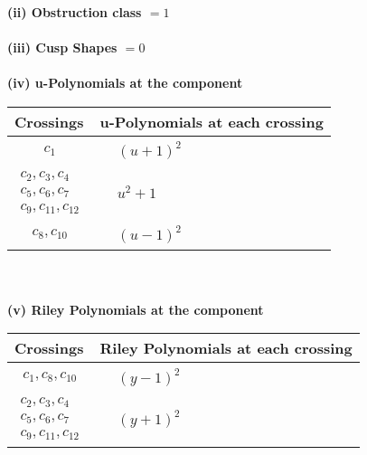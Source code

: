 \documentclass[1p]{elsarticle_modified}
\theoremstyle{definition}
\begin{document}
\flushleft \textbf{(ii) Obstruction class $= 1$}\\~\\
\flushleft \textbf{(iii) Cusp Shapes $= 0$}\\~\\
\newpage\renewcommand{\arraystretch}{1}
\flushleft \textbf{(iv) u-Polynomials at the component}\newline \\
\begin{tabular}{m{50pt}|m{274pt}}
Crossings & \hspace{64pt}u-Polynomials at each crossing \\
\hline $$\begin{aligned}c_{1}\end{aligned}$$&$\begin{aligned}
&(u+1)^2
\end{aligned}$\\
\hline $$\begin{aligned}c_{2},c_{3},c_{4}\\c_{5},c_{6},c_{7}\\c_{9},c_{11},c_{12}\end{aligned}$$&$\begin{aligned}
&u^2+1
\end{aligned}$\\
\hline $$\begin{aligned}c_{8},c_{10}\end{aligned}$$&$\begin{aligned}
&(u-1)^2
\end{aligned}$\\
\hline
\end{tabular}\\~\\
\newpage\renewcommand{\arraystretch}{1}
\flushleft \textbf{(v) Riley Polynomials at the component}\newline \\
\begin{tabular}{m{50pt}|m{274pt}}
Crossings & \hspace{64pt}Riley Polynomials at each crossing \\
\hline $$\begin{aligned}c_{1},c_{8},c_{10}\end{aligned}$$&$\begin{aligned}
&(y-1)^2
\end{aligned}$\\
\hline $$\begin{aligned}c_{2},c_{3},c_{4}\\c_{5},c_{6},c_{7}\\c_{9},c_{11},c_{12}\end{aligned}$$&$\begin{aligned}
&(y+1)^2
\end{aligned}$\\
\hline
\end{tabular}\\~\\
\end{document}
